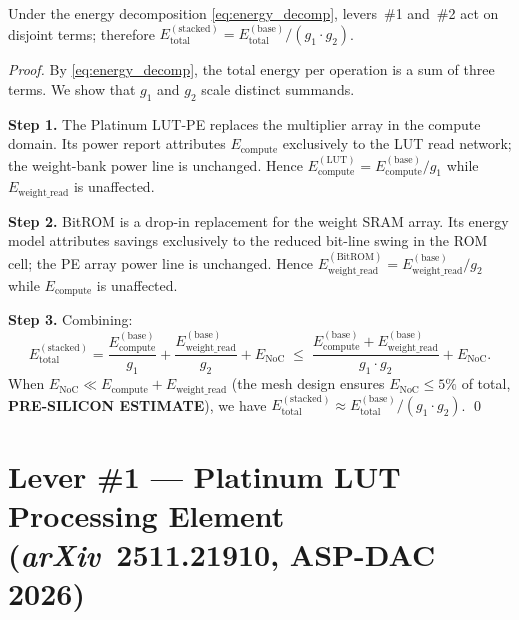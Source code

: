 \begin{lemma}\label{lem:gain_independence}
Under the energy decomposition \eqref{eq:energy_decomp}, levers~\#1 and~\#2
act on disjoint terms; therefore
\(E_{\mathrm{total}}^{(\mathrm{stacked})}
  = E_{\mathrm{total}}^{(\mathrm{base})} / (g_{1} \cdot g_{2})\).
\end{lemma}
\begin{proof}
By \eqref{eq:energy_decomp}, the total energy per operation is a sum of three
terms.  We show that \(g_{1}\) and \(g_{2}\) scale distinct summands.

\medskip
\noindent\textbf{Step 1.}
The Platinum LUT-PE \cite{platinum_lut_pe_2026} replaces the multiplier array
in the compute domain.  Its power report attributes \(E_{\mathrm{compute}}\)
exclusively to the LUT read network; the weight-bank power line is unchanged.
Hence \(E_{\mathrm{compute}}^{(\mathrm{LUT})} = E_{\mathrm{compute}}^{(\mathrm{base})} / g_{1}\)
while \(E_{\mathrm{weight\_read}}\) is unaffected.

\medskip
\noindent\textbf{Step 2.}
BitROM \cite{bitrom_2025} is a drop-in replacement for the weight SRAM array.
Its energy model attributes savings exclusively to the reduced bit-line swing in
the ROM cell; the PE array power line is unchanged.
Hence \(E_{\mathrm{weight\_read}}^{(\mathrm{BitROM})} = E_{\mathrm{weight\_read}}^{(\mathrm{base})} / g_{2}\)
while \(E_{\mathrm{compute}}\) is unaffected.

\medskip
\noindent\textbf{Step 3.}
Combining:
\[
  E_{\mathrm{total}}^{(\mathrm{stacked})}
  = \frac{E_{\mathrm{compute}}^{(\mathrm{base})}}{g_{1}}
  + \frac{E_{\mathrm{weight\_read}}^{(\mathrm{base})}}{g_{2}}
  + E_{\mathrm{NoC}}
  \;\leq\;
  \frac{E_{\mathrm{compute}}^{(\mathrm{base})} + E_{\mathrm{weight\_read}}^{(\mathrm{base})}}{g_{1} \cdot g_{2}}
  + E_{\mathrm{NoC}}.
\]
When \(E_{\mathrm{NoC}} \ll E_{\mathrm{compute}} + E_{\mathrm{weight\_read}}\)
(the mesh design ensures \(E_{\mathrm{NoC}} \leq 5\%\) of total,
\textbf{PRE-SILICON ESTIMATE}), we have
\(E_{\mathrm{total}}^{(\mathrm{stacked})}
  \approx E_{\mathrm{total}}^{(\mathrm{base})} / (g_{1} \cdot g_{2})\).
\qed
\end{proof}

\section{Lever \#1 --- Platinum LUT Processing Element
  (\textit{arXiv}~2511.21910, ASP-DAC 2026)}
\label{sec:lever1}

